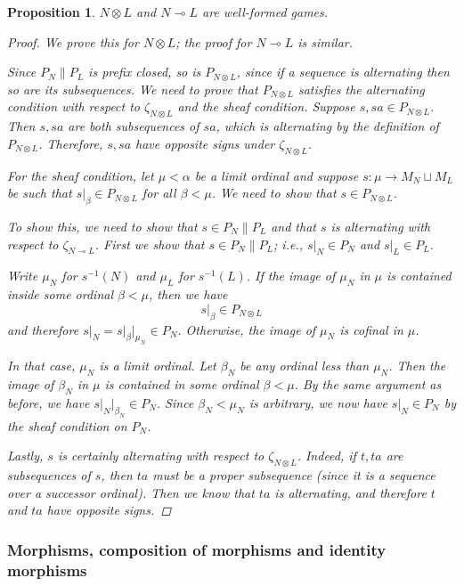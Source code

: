 \documentclass[11pt]{article} %
\theoremstyle{plain} %
\newtheorem{proposition}[theorem]{Proposition}
\theoremstyle{definition} %
\theoremstyle{exercisestyle}
\newcommand*\from{\colon}
\newcommand{\cmap}[3]{#1\from{}#2\to{}#3}
\def \inv {^{-1}}
\newcommand{\tensor}{\otimes}
\renewcommand{\implies}{\multimap}
\newcommand{\cprd}{\sqcup}
\begin{document}
\begin{proposition}
$N\tensor L$ and $N\implies L$ are well-formed games.

\begin{proof}
  We prove this for $N\tensor L$; the proof for $N\implies L$ is similar.

  Since $P_N\|P_L$ is prefix closed, so is $P_{N\tensor L}$, since if a sequence is alternating then so are its subsequences.  We need to prove that $P_{N\tensor L}$ satisfies the alternating condition with respect to $\zeta_{N\tensor L}$ and the sheaf condition.  Suppose $s,sa\in P_{N\tensor L}$.  Then $s,sa$ are both subsequences of $sa$, which is alternating by the definition of $P_{N\tensor L}$.  Therefore, $s,sa$ have opposite signs under $\zeta_{N\tensor L}$.  

  For the sheaf condition, let $\mu<\alpha$ be a limit ordinal and suppose $\cmap{s}{\mu}{M_N\cprd M_L}$ be such that $s\vert_\beta\in P_{N\tensor L}$ for all $\beta<\mu$.  We need to show that $s\in P_{N\tensor L}$.  

  To show this, we need to show that $s\in P_N\|P_L$ and that $s$ is alternating with respect to $\zeta_{N\implies L}$.  First we show that $s\in P_N\|P_L$; i.e., $s\vert_N\in P_N$ and $s\vert_L\in P_L$.  
  
  Write $\mu_N$ for $s\inv(N)$ and $\mu_L$ for $s\inv(L)$.  If the image of $\mu_N$ in $\mu$ is contained inside some ordinal $\beta<\mu$, then we have
  \[
    s\vert_\beta\in P_{N\tensor L}
  \]
  and therefore $s\vert_N=s\vert_\beta\vert_{\mu_N}\in P_N$.  Otherwise, the image of $\mu_N$ is cofinal in $\mu$.  

  In that case, $\mu_N$ is a limit ordinal.  Let $\beta_N$ be any ordinal less than $\mu_N$.  Then the image of $\beta_N$ in $\mu$ is contained in some ordinal $\beta<\mu$.  By the same argument as before, we have $s\vert_N\vert_{\beta_N}\in P_N$.  Since $\beta_N<\mu_N$ is arbitrary, we now have $s\vert_N\in P_N$ by the sheaf condition on $P_N$.

  Lastly, $s$ is certainly alternating with respect to $\zeta_{N\tensor L}$.  Indeed, if $t,ta$ are subsequences of $s$, then $ta$ must be a \emph{proper} subsequence (since it is a sequence over a successor ordinal).  Then we know that $ta$ is alternating, and therefore $t$ and $ta$ have opposite signs.
\end{proof}
\end{proposition}

\subsubsection{Morphisms, composition of morphisms and identity morphisms}
\end{document}
